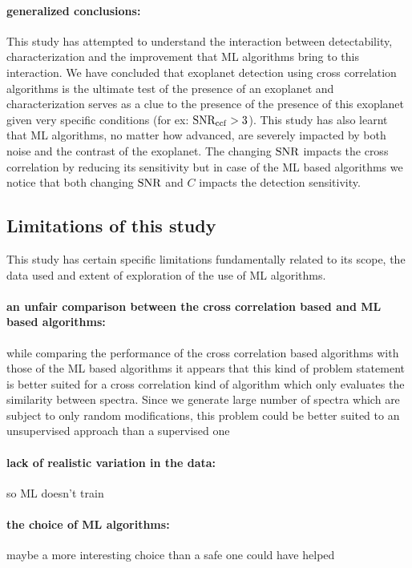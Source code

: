\paragraph{generalized conclusions:\\}
This study has attempted to understand the interaction between detectability, characterization and the improvement that ML algorithms bring to this interaction.
We have concluded that exoplanet detection using cross correlation algorithms is the ultimate test of the presence of an exoplanet and characterization serves as a clue to the presence of the presence of this exoplanet given very specific conditions (for ex: $\rm{SNR_{ccf}}>3$).
This study has also learnt that ML algorithms, no matter how advanced, are severely impacted by both noise and the contrast of the exoplanet.
The changing $\rm{SNR}$ impacts the cross correlation by reducing its sensitivity but in case of the ML based algorithms we notice that both changing $\rm{SNR}$ and $C$ impacts the detection sensitivity.
\subsection{Limitations of this study}
This study has certain specific limitations fundamentally related to its scope, the data used and extent of exploration of the use of ML algorithms.
\paragraph{an unfair comparison between the cross correlation based and ML based algorithms:\\}
while comparing the performance of the cross correlation based algorithms with those of the ML based algorithms it appears that this kind of problem statement is better suited for a cross correlation kind of algorithm which only evaluates the similarity between spectra.
Since we generate large number of spectra which are subject to only random modifications, this problem  could be better suited to an unsupervised approach than a supervised one 
\paragraph{lack of realistic variation in the data:\\}
so ML doesn't train
\paragraph{the choice of ML algorithms:\\}
maybe a more interesting choice than a safe one could have helped
